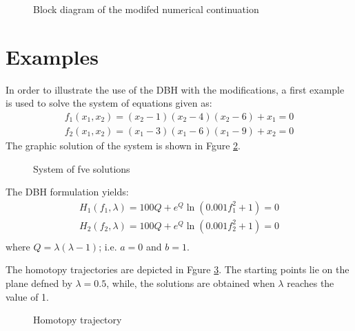 \documentclass[conference]{IEEEtran}
\begin{document}
\begin{figure}[hbtp]
\centerline{
\epsfxsize=52mm
}
\caption{Block diagram of the modifed numerical continuation}
\label{bloques}
\end{figure}


\section{Examples}


In order to illustrate the use of the DBH with the modifications, a
first example is used to solve the system of equations given as:
\begin{displaymath}
\begin{array}{c}
f_1(x_1,x_2)=(x_2-1)(x_2-4)(x_2-6)+x_1=0\\
f_2(x_1,x_2)=(x_1-3)(x_1-6)(x_1-9)+x_2=0
\end{array}
\end{displaymath}
The graphic solution of the system is shown in Fgure \ref{9sol}.

\begin{figure}[hbtp]
\centerline{
\epsfxsize=90mm
}
\caption{System of fve solutions}
\label{9sol}
\end{figure}

The DBH formulation yields:
\begin{displaymath}
\begin{array}{c}
H_1(f_1,\lambda)=100Q+e^{Q}\ln(0.001f_1^2+1)=0\\
H_2(f_2,\lambda)=100Q+e^{Q}\ln(0.001f_2^2+1)=0\\
\end{array}
\end{displaymath}
where $Q=\lambda(\lambda-1)$; i.e. $a=0$ and $b=1$.



The homotopy trajectories  are depicted
in Fgure \ref{homote}. The starting points lie on the plane defned by $\lambda=0.5$, while,
the solutions are obtained when $\lambda$ reaches the value of 1.

\begin{figure}[h]
\centerline{
\epsfxsize=90mm
}
\caption{Homotopy trajectory}
\label{homote}
\end{figure}
\end{document}
